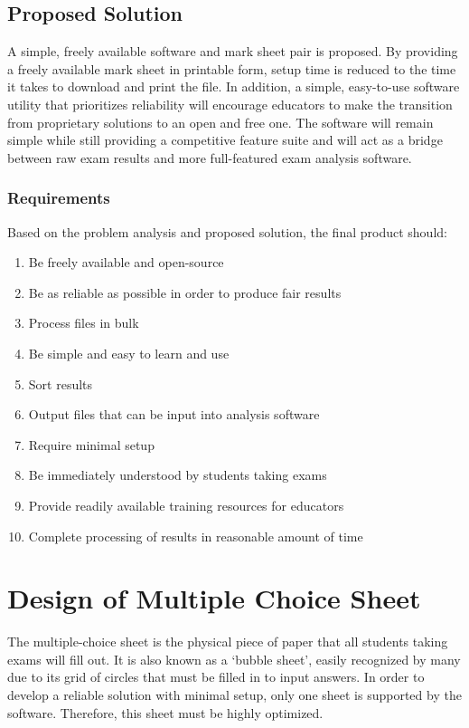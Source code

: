 \documentclass[12pt, letterpaper]{report}
\begin{document}
\section{Proposed Solution}
A simple, freely available software and mark sheet pair is proposed. By
providing a freely available mark sheet in printable form, setup time is reduced
to the time it takes to download and print the file. In addition, a simple,
easy-to-use software utility that prioritizes reliability will encourage
educators to make the transition from proprietary solutions to an open and free
one. The software will remain simple while still providing a competitive feature
suite and will act as a bridge between raw exam results and more full-featured
exam analysis software.
\subsection{Requirements}
Based on the problem analysis and proposed solution, the final product should:

\begin{enumerate}
  \item Be freely available and open-source
  \item Be as reliable as possible in order to produce fair results
  \item Process files in bulk
  \item Be simple and easy to learn and use
  \item Sort results
  \item Output files that can be input into analysis software
  \item Require minimal setup
  \item Be immediately understood by students taking exams
  \item Provide readily available training resources for educators
  \item Complete processing of results in reasonable amount of time
\end{enumerate}

\chapter{Design of Multiple Choice Sheet}
The multiple-choice sheet is the physical piece of paper that all students
taking exams will fill out. It is also known as a `bubble sheet', easily recognized
by many due to its grid of circles that must be filled in to input answers. In order to
develop a reliable solution with minimal setup, only one sheet is supported
by the software. Therefore, this sheet must be highly optimized.
\end{document}
